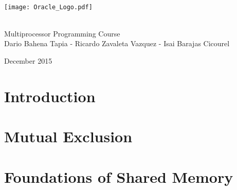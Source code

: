 \documentclass[letter,12pt]{report}
\begin{document}
\begin{titlepage}
\begin{center}

~\\[4 cm]

\texttt{[image: Oracle\_Logo.pdf]}

~\\[0.5 cm]

{\LARGE Multiprocessor Programming Course} \\[0.2 cm]

{Dario Bahena Tapia - Ricardo Zavaleta Vazquez - Isai Barajas Cicourel}

{\small December 2015}

\end{center}
\end{titlepage}

\tableofcontents

\chapter{Introduction}


\chapter{Mutual Exclusion}






\chapter{Foundations of Shared Memory}








\end{document}
